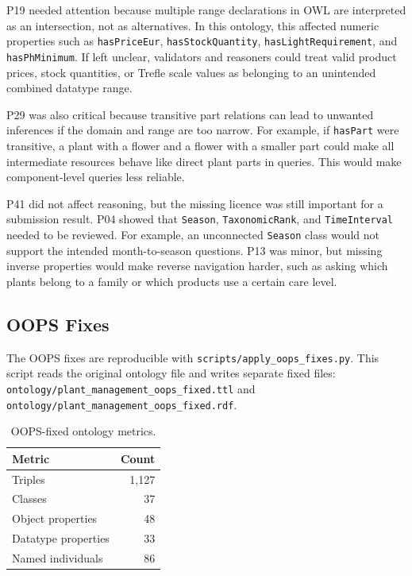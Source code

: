 \documentclass[11pt,a4paper]{article}
\newcommand{\artifact}[1]{\texttt{#1}}
\begin{document}
P19 needed attention because multiple range declarations in OWL are interpreted
as an intersection, not as alternatives. In this ontology, this affected numeric
properties such as \artifact{hasPriceEur}, \artifact{hasStockQuantity},
\artifact{hasLightRequirement}, and \artifact{hasPhMinimum}. If left unclear,
validators and reasoners could treat valid product prices, stock quantities, or
Trefle scale values as belonging to an unintended combined datatype range.

P29 was also critical because transitive part relations can lead to unwanted
inferences if the domain and range are too narrow. For example, if
\artifact{hasPart} were transitive, a plant with a flower and a flower with a
smaller part could make all intermediate resources behave like direct plant
parts in queries. This would make component-level queries less reliable.

P41 did not affect reasoning, but the missing licence was still important for a
submission result. P04 showed that \artifact{Season},
\artifact{TaxonomicRank}, and \artifact{TimeInterval} needed to be reviewed.
For example, an unconnected \artifact{Season} class would not support the
intended month-to-season questions. P13 was minor, but missing inverse
properties would make reverse navigation harder, such as asking which plants
belong to a family or which products use a certain care level.

\subsection{OOPS Fixes}

The OOPS fixes are reproducible with
\artifact{scripts/apply\_oops\_fixes.py}. This script reads the original ontology
file and writes separate fixed files:
\artifact{ontology/plant\_management\_oops\_fixed.ttl} and
\artifact{ontology/plant\_management\_oops\_fixed.rdf}.

\begin{table}[h]
\centering
\begin{tabular}{lr}
\toprule
Metric & Count \\
\midrule
Triples & 1,127 \\
Classes & 37 \\
Object properties & 48 \\
Datatype properties & 33 \\
Named individuals & 86 \\
\bottomrule
\end{tabular}
\caption{OOPS-fixed ontology metrics.}
\label{tab:oops-fixed-metrics}
\end{table}
\end{document}
